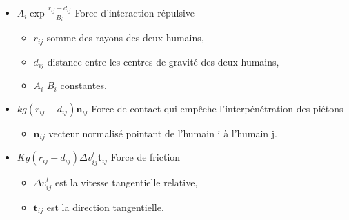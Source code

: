 \begin{itemize}[leftmargin=1cm, label=, itemsep=0pt]%
\item  $A_i \exp{\frac{r_{ij}-d_{ij}}{B_i}}$ Force d'interaction répulsive
\begin{itemize}[leftmargin=1cm, label=, itemsep=0pt]%
\item  $r_{ij}$ somme des rayons des deux humains,
\item  $d_{ij}$ distance entre les centres de gravité des deux humains,
\item  $A_i$ $B_i$ constantes.
\end{itemize}
\item  $kg(r_{ij}-d_{ij})\mathbf{n}_{ij}$ Force de contact qui empêche l'interpénétration des piétons
\begin{itemize}[leftmargin=1cm, label=, itemsep=0pt]%
\item  $\mathbf{n}_{ij}$ vecteur normalisé pointant de l'humain i à l'humain j.
\end{itemize}
\item  $Kg(r_{ij}-d_{ij})\Delta v^t_{ij}\mathbf{t}_{ij}$ Force de friction
\begin{itemize}[leftmargin=1cm, label=, itemsep=0pt]%
\item  $\Delta v^t_{ij}$ est la vitesse tangentielle relative,
\item  $\mathbf{t}_{ij}$ est la direction tangentielle.
\end{itemize}
\end{itemize}
%
